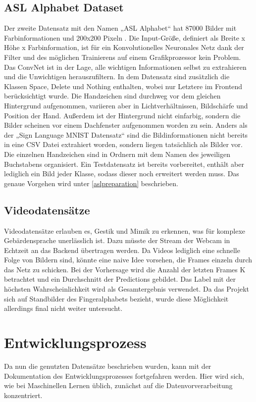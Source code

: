 \documentclass[11pt,bibliography=totocnumbered]{scrartcl}
\begin{document}
\subsection{ASL Alphabet Dataset}
Der zweite Datensatz mit den Namen „ASL Alphabet“ hat 87000 Bilder mit Farbinformationen und 200x200 Pixeln \cite{ASLMNIST}. Die Input-Größe, definiert als Breite x Höhe x Farbinformation, ist für ein Konvolutionelles Neuronales Netz dank der Filter und des möglichen Trainierens auf einem Grafikprozessor kein Problem. Das ConvNet ist in der Lage, alle wichtigen Informationen selbst zu extrahieren und die Unwichtigen herauszufiltern. In dem Datensatz sind zusätzlich die Klassen Space, Delete und Nothing enthalten, wobei nur Letztere im Frontend berücksichtigt wurde. Die Handzeichen sind durchweg vor dem gleichen Hintergrund aufgenommen, variieren aber in Lichtverhältnissen, Bildschärfe und Position der Hand. Außerdem ist der Hintergrund nicht einfarbig, sondern die Bilder scheinen vor einem Dachfenster aufgenommen worden zu sein. Anders als der „Sign Language MNIST Datensatz“ sind die Bildinformationen nicht bereits in eine CSV Datei extrahiert worden, sondern liegen tatsächlich als Bilder vor. Die einzelnen Handzeichen sind in Ordnern mit dem Namen des jeweiligen Buchstabens organisiert. Ein Testdatensatz ist bereits vorbereitet, enthält aber lediglich ein Bild jeder Klasse, sodass dieser noch erweitert werden muss. Das genaue Vorgehen wird unter \ref{aslpreparation} beschrieben.
\subsection{Videodatensätze}
Videodatensätze erlauben es, Gestik und Mimik zu erkennen, was für komplexe Gebärdensprache unerlässlich ist. Dazu müsste der Stream der Webcam in Echtzeit an das Backend übertragen werden. Da Videos lediglich eine schnelle Folge von Bildern sind, könnte eine naive Idee vorsehen, die Frames einzeln durch das Netz zu schicken. Bei der Vorhersage wird die Anzahl der letzten Frames K betrachtet und ein Durchschnitt der Predictions gebildet. Das Label mit der höchsten Wahrscheinlichkeit wird als Gesamtergebnis verwendet. Da das Projekt sich auf Standbilder des Fingeralphabets bezieht, wurde diese Möglichkeit allerdings final nicht weiter untersucht.
\section{Entwicklungsprozess}
Da nun die genutzten Datensätze beschrieben wurden, kann mit der Dokumentation des Entwicklungsprozesses fortgefahren werden. Hier wird sich, wie bei Maschinellen Lernen üblich, zunächst auf die Datenvorverarbeitung konzentriert.
\end{document}
